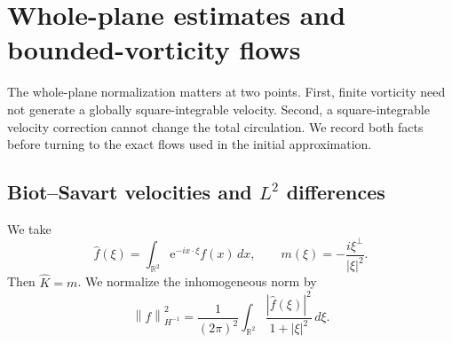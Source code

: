 \documentclass[11pt,a4paper,reqno]{amsart}
\theoremstyle{plain}
\theoremstyle{definition}
\theoremstyle{remark}
\numberwithin{equation}{section}
\newcommand{\R}{\mathbb R}
\newcommand{\norm}[2]{\left\|#1\right\|_{#2}}
\newcommand{\dd}{\,dx}
\newcommand{\ee}{\mathrm e}
\begin{document}
\section{Whole-plane estimates and bounded-vorticity flows}\label{sec:prelim}

The whole-plane normalization matters at two points. First, finite
vorticity need not generate a globally square-integrable velocity.
Second, a square-integrable velocity correction cannot change the
total circulation. We record both facts before turning to the exact
flows used in the initial approximation.

\subsection{Biot--Savart velocities and \texorpdfstring{$L^2$}{L2} differences}

We take
\[
 \widehat f(\xi)=\int_{\R^2}\ee^{-ix\cdot\xi}f(x)\dd,
 \qquad m(\xi)=-\frac{i\xi^\perp}{|\xi|^2}.
\]
Then $\widehat K=m$. We normalize the inhomogeneous norm by
\[
 \norm f{H^{-1}}^2=\frac1{(2\pi)^2}
   \int_{\R^2}\frac{|\widehat f(\xi)|^2}{1+|\xi|^2}\,d\xi.
\]
\end{document}
